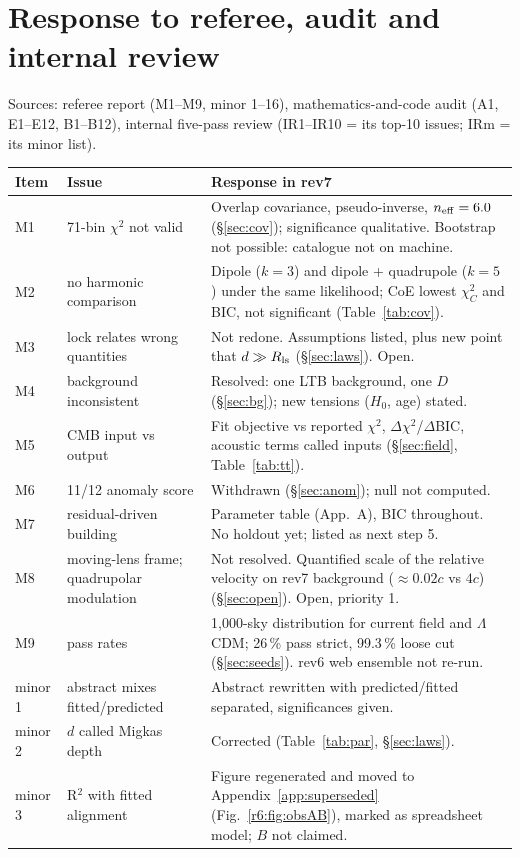 \documentclass[11pt]{article}
\begin{document}
\section{Response to referee, audit and internal review}\label{app:resp}
\small
Sources: referee report (M1--M9, minor 1--16), mathematics-and-code audit (A1, E1--E12, B1--B12), internal five-pass review (IR1--IR10 = its top-10 issues; IRm = its minor list).
\begin{longtable}{@{}p{1.3cm}p{5.2cm}p{8.6cm}@{}}\toprule
Item & Issue & Response in rev7\\\midrule\endhead
M1 & 71-bin $\chi^2$ not valid & Overlap covariance, pseudo-inverse, $n_{\rm eff}=6.0$ (\S\ref{sec:cov}); significance qualitative. Bootstrap not possible: catalogue not on machine.\\
M2 & no harmonic comparison & Dipole ($k=3$) and dipole + quadrupole ($k=5$) under the same likelihood; CoE lowest $\chi^2_C$ and BIC, not significant (Table~\ref{tab:cov}).\\
M3 & lock relates wrong quantities & Not redone. Assumptions listed, plus new point that $d\gg R_{\rm ls}$ (\S\ref{sec:laws}). Open.\\
M4 & background inconsistent & Resolved: one LTB background, one $D$ (\S\ref{sec:bg}); new tensions ($H_0$, age) stated.\\
M5 & CMB input vs output & Fit objective vs reported $\chi^2$, $\Delta\chi^2$/$\Delta$BIC, acoustic terms called inputs (\S\ref{sec:field}, Table~\ref{tab:tt}).\\
M6 & 11/12 anomaly score & Withdrawn (\S\ref{sec:anom}); null not computed.\\
M7 & residual-driven building & Parameter table (App.~A), BIC throughout. No holdout yet; listed as next step 5.\\
M8 & moving-lens frame; quadrupolar modulation & Not resolved. Quantified scale of the relative velocity on rev7 background ($\approx0.02c$ vs $4c$) (\S\ref{sec:open}). Open, priority 1.\\
M9 & pass rates & 1,000-sky distribution for current field and $\Lambda$CDM; 26\,\% pass strict, 99.3\,\% loose cut (\S\ref{sec:seeds}). rev6 web ensemble not re-run.\\
minor 1 & abstract mixes fitted/predicted & Abstract rewritten with predicted/fitted separated, significances given.\\
minor 2 & $d$ called Migkas depth & Corrected (Table~\ref{tab:par}, \S\ref{sec:laws}).\\
minor 3 & R$^2$ with fitted alignment & Figure regenerated and moved to Appendix~\ref{app:superseded} (Fig.~\ref{r6:fig:obsAB}), marked as spreadsheet model; $B$ not claimed.\\

\end{longtable}
\end{document}
